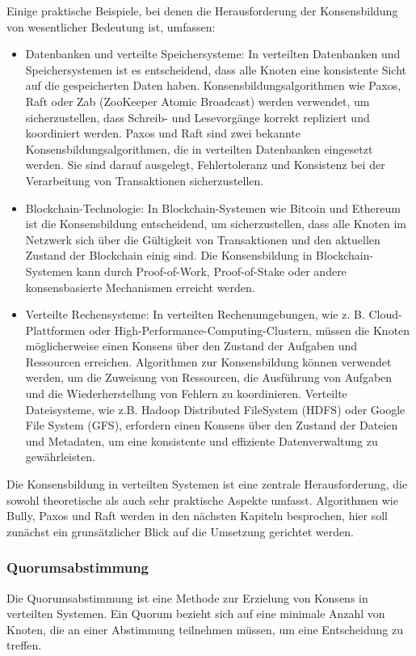 Einige praktische Beispiele, bei denen die Herausforderung der Konsensbildung von wesentlicher Bedeutung ist, umfassen:
\begin{itemize}
\item Datenbanken und verteilte Speichersysteme: In verteilten Datenbanken und Speichersystemen ist es entscheidend, dass alle Knoten eine konsistente Sicht auf die gespeicherten Daten haben. Konsensbildungsalgorithmen wie Paxos, Raft oder Zab (ZooKeeper Atomic Broadcast) werden verwendet, um sicherzustellen, dass Schreib- und Lesevorgänge korrekt repliziert und koordiniert werden. 
Paxos und Raft sind zwei bekannte Konsensbildungsalgorithmen, die in verteilten Datenbanken eingesetzt werden. Sie sind darauf ausgelegt, Fehlertoleranz und Konsistenz bei der Verarbeitung von Transaktionen sicherzustellen.

\item Blockchain-Technologie: In Blockchain-Systemen wie Bitcoin und Ethereum ist die Konsensbildung entscheidend, um sicherzustellen, dass alle Knoten im Netzwerk sich über die Gültigkeit von Transaktionen und den aktuellen Zustand der Blockchain einig sind. Die Konsensbildung in Blockchain-Systemen kann durch Proof-of-Work, Proof-of-Stake oder andere konsensbasierte Mechanismen erreicht werden.

\item Verteilte Rechensysteme: In verteilten Rechenumgebungen, wie z. B. Cloud-Plattformen oder High-Performance-Computing-Clustern, müssen die Knoten möglicherweise einen Konsens über den Zustand der Aufgaben und Ressourcen erreichen. Algorithmen zur Konsensbildung können verwendet werden, um die Zuweisung von Ressourcen, die Ausführung von Aufgaben und die Wiederherstellung von Fehlern zu koordinieren. Verteilte Dateisysteme, wie z.B. Hadoop Distributed FileSystem (HDFS) oder Google File System (GFS), erfordern einen Konsens über den Zustand der Dateien und Metadaten, um eine konsistente und effiziente Datenverwaltung zu gewährleisten.
\end{itemize}
Die Konsensbildung in verteilten Systemen ist eine zentrale Herausforderung, die sowohl theoretische als auch sehr praktische Aspekte umfasst. Algorithmen wie Bully, Paxos und Raft werden in den nächsten Kapiteln besprochen, hier soll zunächst ein grunsätzlicher Blick auf die Umsetzung gerichtet werden.

\subsubsection{Quorumsabstimmung}
Die Quorumsabstimmung ist eine Methode zur Erzielung von Konsens in verteilten Systemen. Ein Quorum bezieht sich auf eine minimale Anzahl von Knoten, die an einer Abstimmung teilnehmen müssen, um eine Entscheidung zu treffen.

